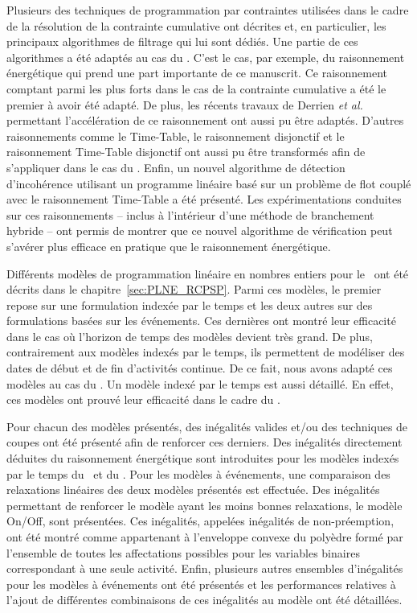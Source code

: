 Plusieurs des techniques de programmation par contraintes utilisées dans le
cadre de la résolution de la contrainte cumulative ont décrites et, en
particulier, les principaux algorithmes de filtrage qui lui sont
dédiés. Une partie de ces algorithmes a été adaptés au cas du
\CECSP. C'est le cas, par exemple, du raisonnement énergétique qui
prend une part importante de ce manuscrit. Ce raisonnement comptant
parmi les plus forts dans le cas de la contrainte cumulative a été le
premier à avoir été adapté. De plus, les récents travaux de Derrien
{\it et al.} permettant l'accélération de ce raisonnement ont aussi pu
être adaptés. D'autres raisonnements comme le Time-Table, le
raisonnement disjonctif et le raisonnement Time-Table disjonctif ont
aussi pu être transformés afin de s'appliquer dans le cas du
\CECSP. Enfin, un nouvel algorithme de détection d'incohérence
utilisant un programme linéaire basé sur un problème de flot couplé
avec le raisonnement Time-Table a été présenté. Les expérimentations
conduites sur ces raisonnements -- inclus à l'intérieur d'une méthode
de branchement hybride -- ont permis de montrer que ce nouvel
algorithme de vérification peut s'avérer plus efficace en pratique que
le raisonnement énergétique.

Différents modèles de programmation linéaire en nombres entiers pour le
\RCPSP~ont été décrits dans le chapitre~\ref{sec:PLNE_RCPSP}. Parmi
ces modèles, le premier repose sur une formulation indexée par le temps
et les deux autres sur des formulations basées sur les événements. Ces
dernières ont montré leur efficacité dans le cas où l'horizon de temps
des modèles devient très grand. De plus, contrairement aux modèles
indexés par le temps, ils permettent de modéliser des dates de début
et de fin d'activités continue. De ce fait, nous avons adapté ces
modèles au cas du \CECSP. Un modèle indexé par le temps est aussi
détaillé. En effet, ces modèles ont prouvé leur efficacité dans le
cadre du \RCPSP.

Pour chacun des modèles présentés, des inégalités valides et/ou des
techniques de coupes ont été présenté afin de renforcer ces
derniers. Des inégalités directement déduites du raisonnement
énergétique sont introduites pour les modèles indexés par le temps du
\CECSP~et du \RCPSP. Pour les modèles à événements, une comparaison
des relaxations linéaires des deux modèles présentés est
effectuée. Des inégalités permettant de renforcer le modèle ayant les
moins bonnes relaxations, le modèle On/Off, sont présentées. Ces
inégalités, appelées inégalités de non-préemption, ont été montré
comme appartenant à l'enveloppe convexe du polyèdre formé par
l’ensemble de toutes les affectations possibles pour les variables
binaires correspondant à une seule activité. Enfin, plusieurs autres
ensembles d'inégalités pour les modèles à événements ont été présentés
et les performances relatives à l'ajout de différentes combinaisons de
ces inégalités au modèle ont été détaillées. 

